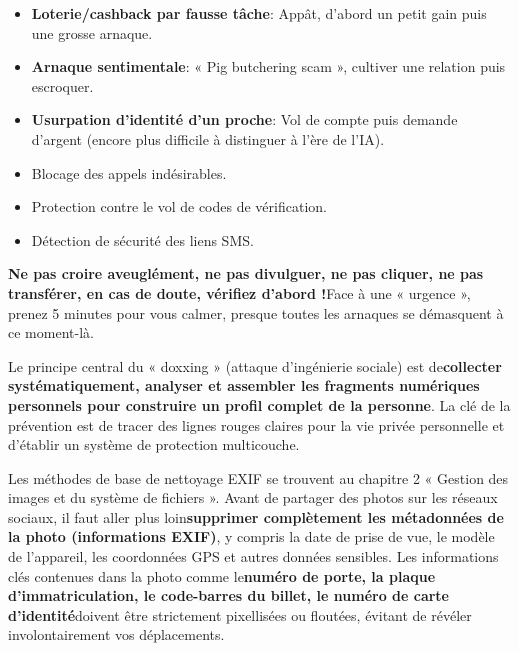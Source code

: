 
\begin{itemize}
  \item \textbf{Loterie/cashback par fausse tâche}: Appât, d'abord un petit gain puis une grosse arnaque.
  \item \textbf{Arnaque sentimentale}: « Pig butchering scam », cultiver une relation puis escroquer.
  \item \textbf{Usurpation d'identité d'un proche}: Vol de compte puis demande d'argent (encore plus difficile à distinguer à l'ère de l'IA).
\end{itemize}


\begin{itemize}
  \item Blocage des appels indésirables.
  \item Protection contre le vol de codes de vérification.
  \item Détection de sécurité des liens SMS.
\end{itemize}


\textbf{Ne pas croire aveuglément, ne pas divulguer, ne pas cliquer, ne pas transférer, en cas de doute, vérifiez d'abord !}Face à une « urgence », prenez 5 minutes pour vous calmer, presque toutes les arnaques se démasquent à ce moment-là.


Le principe central du « doxxing » (attaque d'ingénierie sociale) est de\textbf{collecter systématiquement, analyser et assembler les fragments numériques personnels pour construire un profil complet de la personne}. La clé de la prévention est de tracer des lignes rouges claires pour la vie privée personnelle et d'établir un système de protection multicouche.


Les méthodes de base de nettoyage EXIF se trouvent au chapitre 2 « Gestion des images et du système de fichiers ». Avant de partager des photos sur les réseaux sociaux, il faut aller plus loin\textbf{supprimer complètement les métadonnées de la photo (informations EXIF)}, y compris la date de prise de vue, le modèle de l'appareil, les coordonnées GPS et autres données sensibles. Les informations clés contenues dans la photo comme le\textbf{numéro de porte, la plaque d'immatriculation, le code-barres du billet, le numéro de carte d'identité}doivent être strictement pixellisées ou floutées, évitant de révéler involontairement vos déplacements.

